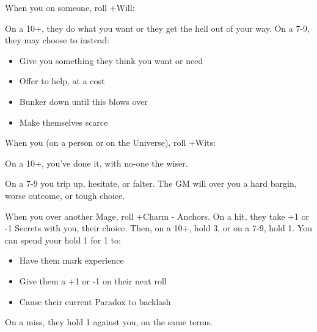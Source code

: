 



\begin{multicols}{3}

  \begin{move}
    When you  on someone, roll +Will:

    On a 10+, they do what you want or they get the hell out of your
    way. On a 7-9, they may choose to instead:
    \begin{itemize}
      \setlength\itemsep{0em}
    \item Give you something they think you want or need
    \item Offer to help, at a cost
    \item Bunker down until this blows over
    \item Make themselves scarce
    \end{itemize}
  \end{move}

  \SEPARATOR
  
  \begin{move}
    When you  (on a person or on the Universe),
    roll +Wits:

    On a 10+, you've done it, with no-one the wiser.

    On a 7-9 you trip up, hesitate, or falter. The GM will over you a
    hard bargin, worse outcome, or tough choice.
  \end{move}

  \SEPARATOR

  \begin{move}
    When you  over
    another Mage, roll +Charm - Anchors. On a hit, they take +1 or -1
    Secrets with you, their choice. Then, on a 10+, hold 3, or on a
    7-9, hold 1. You can spend your hold 1 for 1 to:
    \begin{itemize}
      \setlength\itemsep{0em}
    \item Have them mark experience
    \item Give them a +1 or -1 on their next roll
    \item Cause their current Paradox to backlash
    \end{itemize}
    On a miss, they hold 1 against you, on the same terms.
  \end{move}

  \columnbreak
  

\end{multicols}
